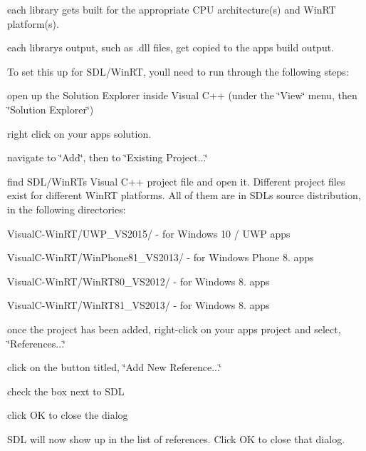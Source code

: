 \begin{DoxyEnumerate}
\item each library gets built for the appropriate C\+PU architecture(s) and Win\+RT platform(s).
\item each library\textquotesingle{}s output, such as .dll files, get copied to the app\textquotesingle{}s build output.
\end{DoxyEnumerate}

To set this up for S\+D\+L/\+Win\+RT, you\textquotesingle{}ll need to run through the following steps\+:


\begin{DoxyEnumerate}
\item open up the Solution Explorer inside Visual C++ (under the \char`\"{}\+View\char`\"{} menu, then \char`\"{}\+Solution Explorer\char`\"{})
\item right click on your app\textquotesingle{}s solution.
\item navigate to \char`\"{}\+Add\char`\"{}, then to \char`\"{}\+Existing Project...\char`\"{}
\item find S\+D\+L/\+Win\+RT\textquotesingle{}s Visual C++ project file and open it. Different project files exist for different Win\+RT platforms. All of them are in S\+DL\textquotesingle{}s source distribution, in the following directories\+:
\begin{DoxyItemize}
\item {\ttfamily Visual\+C-\/\+Win\+R\+T/\+U\+W\+P\+\_\+\+V\+S2015/} -\/ for Windows 10 / U\+WP apps
\item {\ttfamily Visual\+C-\/\+Win\+R\+T/\+Win\+Phone81\+\_\+\+V\+S2013/} -\/ for Windows Phone 8. apps
\item {\ttfamily Visual\+C-\/\+Win\+R\+T/\+Win\+R\+T80\+\_\+\+V\+S2012/} -\/ for Windows 8. apps
\item {\ttfamily Visual\+C-\/\+Win\+R\+T/\+Win\+R\+T81\+\_\+\+V\+S2013/} -\/ for Windows 8. apps
\end{DoxyItemize}
\item once the project has been added, right-\/click on your app\textquotesingle{}s project and select, \char`\"{}\+References...\char`\"{}
\item click on the button titled, \char`\"{}\+Add New Reference...\char`\"{}
\item check the box next to S\+DL
\item click OK to close the dialog
\item S\+DL will now show up in the list of references. Click OK to close that dialog.
\end{DoxyEnumerate}

